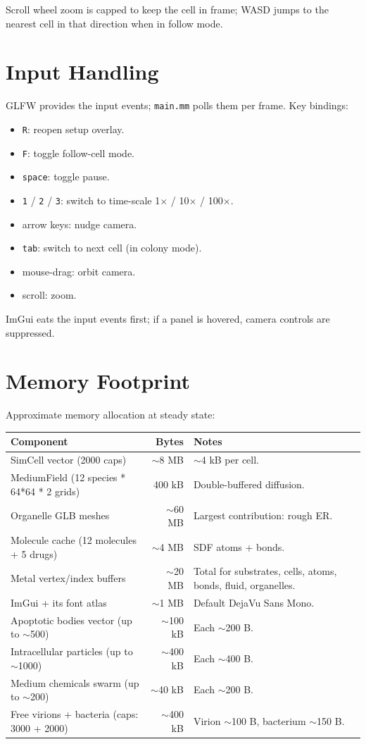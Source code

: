 \documentclass[11pt,letterpaper,twoside,openany]{book}
\newcommand{\code}[1]{\texttt{#1}}
\begin{document}
Scroll wheel zoom is capped to keep the cell in frame; WASD jumps
to the nearest cell in that direction when in follow mode.

\chapter{Input Handling}
\label{ch:input}

GLFW provides the input events; \code{main.mm} polls them per frame.
Key bindings:
\begin{itemize}
  \item \texttt{R}: reopen setup overlay.
  \item \texttt{F}: toggle follow-cell mode.
  \item \texttt{space}: toggle pause.
  \item \texttt{1} / \texttt{2} / \texttt{3}: switch to time-scale
        1$\times$ / 10$\times$ / 100$\times$.
  \item arrow keys: nudge camera.
  \item \texttt{tab}: switch to next cell (in colony mode).
  \item mouse-drag: orbit camera.
  \item scroll: zoom.
\end{itemize}

ImGui eats the input events first; if a panel is hovered, camera
controls are suppressed.

\chapter{Memory Footprint}
\label{ch:memory}

Approximate memory allocation at steady state:
\begin{longtable}{p{5.5cm}rp{6.5cm}}
\toprule
Component & Bytes & Notes\\ \midrule
SimCell vector (2000 caps) & $\sim$8 MB & $\sim$4 kB per cell.\\
MediumField (12 species * 64*64 * 2 grids) & 400 kB & Double-buffered diffusion.\\
Organelle GLB meshes & $\sim$60 MB & Largest contribution: rough ER.\\
Molecule cache (12 molecules + 5 drugs) & $\sim$4 MB & SDF atoms + bonds.\\
Metal vertex/index buffers & $\sim$20 MB & Total for substrates, cells, atoms, bonds, fluid, organelles.\\
ImGui + its font atlas & $\sim$1 MB & Default DejaVu Sans Mono.\\
Apoptotic bodies vector (up to $\sim$500) & $\sim$100 kB & Each $\sim$200 B.\\
Intracellular particles (up to $\sim$1000) & $\sim$400 kB & Each $\sim$400 B.\\
Medium chemicals swarm (up to $\sim$200) & $\sim$40 kB & Each $\sim$200 B.\\
Free virions + bacteria (caps: 3000 + 2000) & $\sim$400 kB & Virion $\sim$100 B, bacterium $\sim$150 B.\\
\bottomrule
\end{longtable}
\end{document}
